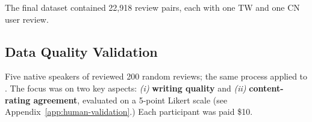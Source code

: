 \vspace{-.5pc}


The final dataset contained 22,918 review pairs, each with one TW and one CN user review.









\subsection{Data Quality Validation\label{sec:data-quality-validation}}
Five native speakers of \twChinese reviewed 200 random \twChinese reviews; the same process applied to \cnChinese.
The focus was on two key aspects: {\em (i)} \textbf{writing quality} and {\em (ii)} \textbf{content-rating agreement}, evaluated on a 5-point Likert scale (see Appendix~\ref{app:human-validation}.) 
Each participant was paid \$10.
